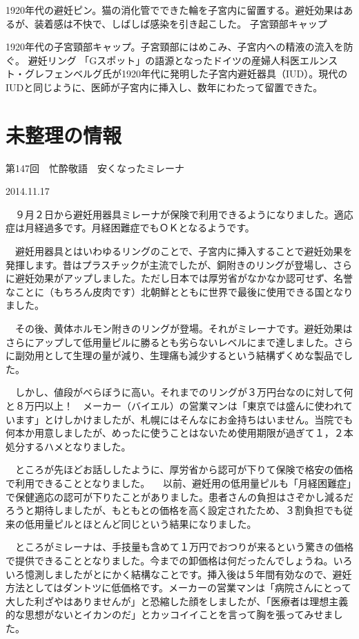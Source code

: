  1920年代の避妊ピン。猫の消化管でできた輪を子宮内に留置する。避妊効果はあるが、装着感は不快で、しばしば感染を引き起こした。
子宮頸部キャップ 

 1920年代の子宮頸部キャップ。子宮頸部にはめこみ、子宮内への精液の流入を防ぐ。
避妊リング 
「Gスポット」の語源となったドイツの産婦人科医エルンスト・グレフェンベルグ氏が1920年代に発明した子宮内避妊器具（IUD）。現代のIUDと同じように、医師が子宮内に挿入し、数年にわたって留置できた。 




\section{未整理の情報}

第147回　忙酔敬語　安くなったミレーナ

2014.11.17

　９月２日から避妊用器具ミレーナが保険で利用できるようになりました。適応症は月経過多です。月経困難症でもＯＫとなるようです。

　避妊用器具とはいわゆるリングのことで、子宮内に挿入することで避妊効果を発揮します。昔はプラスチックが主流でしたが、銅附きのリングが登場し、さらに避妊効果がアップしました。ただし日本では厚労省がなかなか認可せず、名誉なことに（もちろん皮肉です）北朝鮮とともに世界で最後に使用できる国となりました。

　その後、黄体ホルモン附きのリングが登場。それがミレーナです。避妊効果はさらにアップして低用量ピルに勝るとも劣らないレベルにまで達しました。さらに副効用として生理の量が減り、生理痛も減少するという結構ずくめな製品でした。

　しかし、値段がべらぼうに高い。それまでのリングが３万円台なのに対して何と８万円以上！　メーカー（バイエル）の営業マンは「東京では盛んに使われています」とけしかけましたが、札幌にはそんなにお金持ちはいません。当院でも何本か用意しましたが、めったに使うことはないため使用期限が過ぎて１，２本処分するハメとなりました。

　ところが先ほどお話ししたように、厚労省から認可が下りて保険で格安の価格で利用できることとなりました。
　以前、避妊用の低用量ピルも「月経困難症」で保健適応の認可が下りたことがありました。患者さんの負担はさぞかし減るだろうと期待しましたが、もともとの価格を高く設定されたため、３割負担でも従来の低用量ピルとほとんど同じという結果になりました。

　ところがミレーナは、手技量も含めて１万円でおつりが来るという驚きの価格で提供できることとなりました。今までの卸価格は何だったんでしょうね。いろいろ憶測しましたがとにかく結構なことです。挿入後は５年間有効なので、避妊方法としてはダントツに低価格です。メーカーの営業マンは「病院さんにとって大した利ざやはありませんが」と恐縮した顔をしましたが、「医療者は理想主義的な思想がないとイカンのだ」とカッコイイことを言って胸を張ってみせました。


